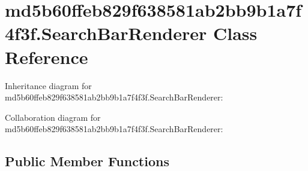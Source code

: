 \hypertarget{classmd5b60ffeb829f638581ab2bb9b1a7f4f3f_1_1_search_bar_renderer}{}\section{md5b60ffeb829f638581ab2bb9b1a7f4f3f.\+Search\+Bar\+Renderer Class Reference}
\label{classmd5b60ffeb829f638581ab2bb9b1a7f4f3f_1_1_search_bar_renderer}


Inheritance diagram for md5b60ffeb829f638581ab2bb9b1a7f4f3f.\+Search\+Bar\+Renderer\+:


Collaboration diagram for md5b60ffeb829f638581ab2bb9b1a7f4f3f.\+Search\+Bar\+Renderer\+:
\subsection*{Public Member Functions}
